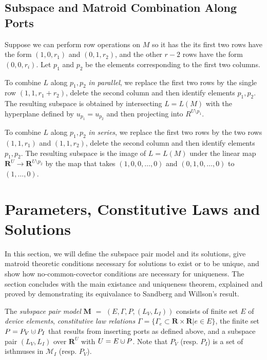 \documentclass{amsproc-sunycstr}
\def\Reals{\ensuremath{\mathbf R}}
\theoremstyle{plain}
\theoremstyle{definition}
\theoremstyle{remark}
\newcommand{\dunion}
{\mbox{\hbox{\hskip4pt$\cdot$\hskip-4.62pt$\cup$\hskip2pt}}}
\begin{document}
\subsection{Subspace and Matroid Combination Along Ports}



Suppose we can perform row operations on $M$ so it has the
its first two rows have the form $(1,0,r_1)$ and $(0,1,r_2)$, and 
the other $r-2$ rows have the form $(0,0,r_i)$.  Let $p_1$ and 
$p_2$ be the elements corresponding to the first two columns.

To combine $L$ along $p_1,p_2$ \textit{in parallel}, we replace the first
two rows by the single row $(1,1,r_1+r_2)$, delete the second
column and then identify elements $p_1,p_2$.
The resulting subspace is obtained by intersecting $L=L(M)$ with
the hyperplane defined by $u_{p_1}=u_{p_2}$ and then projecting into
$R^{U\setminus p_1}$.

To combine $L$ along $p_1,p_2$ \textit{in series}, we replace the first
two rows by the two rows  $(1,1,r_1)$ and $(1,1,r_2)$, delete the second
column and then identify elements $p_1,p_2$.  The resulting subspace is 
the image of $L=L(M)$ under the linear map 
$\Reals^U\rightarrow\Reals^{U\setminus p_2}$ by the map that takes 
$(1,0,0,\ldots,0)$ and $(0,1,0,\ldots,0)$ to $(1,\ldots,0)$.




\section{Parameters, Constitutive Laws and Solutions}

In this section, we will define the subspace pair model and its
solutions, give matroid
theoretic conditions necessary for solutions to exist or
to be unique, and show how no-common-covector conditions are
necessary for uniqueness.  The section concludes with
the main existance and uniqueness theorem, explained and proved
by demonstrating its equivalance to Sandberg and Willson's 
result.



The \textit{subspace pair model} $\mathbf{M}$ $=$ 
$(E, \Gamma, P, (L_V, L_I))$ consists of finite set $E$ of 
\textit{device elements}, \textit{constitutive law relations}
$\Gamma = \{\Gamma_e\subset\Reals\times\Reals | e \in E\}$, the finite set
$P=P_V \dunion P_I$ that results from inserting ports as defined above, 
and a subspace pair $(L_V, L_I)$ over $\Reals^U$ with $U=E\dunion P$.
Note that $P_V$ (resp. $P_I$) is a set of isthmuses
in $\mathcal{M}_I$
(resp. $P_V$).
\end{document}
